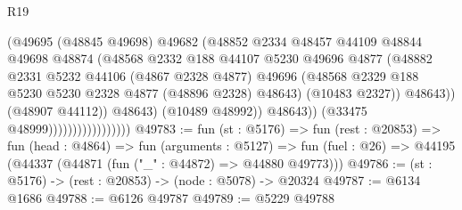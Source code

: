 \begin{lexlean}{R19}
\begin{coremodule}
                                            (@49695
                                              (@48845 @49698)
                                              @49682
                                              (@48852
                                                @2334
                                                @48457
                                                @44109
                                                @48844
                                                @49698
                                                @48874
                                                (@48568
                                                  @2332
                                                  @188
                                                  @44107
                                                  @5230
                                                  @49696
                                                  @4877
                                                  (@48882
                                                    @2331
                                                    @5232
                                                    @44106
                                                    (@4867 @2328 @4877)
                                                    @49696
                                                    (@48568
                                                      @2329
                                                      @188
                                                      @5230
                                                      @5230
                                                      @2328
                                                      @4877
                                                      (@48896 @2328)
                                                      @48643)
                                                    (@10483 @2327))
                                                  @48643))
                                              (@48907 @44112))
                                            @48643)
                                          (@10489 @48992))
                                        @48643))
                                    (@33475 @48999)))))))))))))))))
@49783 := fun (st : @5176) =>
  fun (rest : @20853) =>
  fun (head : @4864) =>
  fun (arguments : @5127) =>
  fun (fuel : @26) => @44195 (@44337 (@44871 (fun ("_" : @44872) => @44880 @49773)))
@49786 := (st : @5176) -> (rest : @20853) -> (node : @5078) -> @20324
@49787 := @6134 @1686
@49788 := @6126 @49787
@49789 := @5229 @49788

\end{coremodule}
\end{lexlean}
